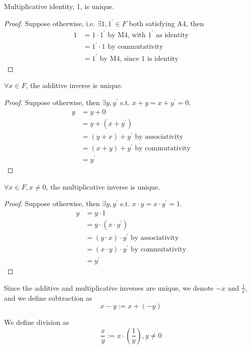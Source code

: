 \begin{remark} Multiplicative identity, 1, is unique.
\end{remark}
\begin{proof} Suppose otherwise, i.e. $\exists 1, 1^{\prime} \in F$ both satisfying A4, then 
  \begin{align*}
      1 &= 1 \cdot 1^{\prime} \text{ by M4, with $1^{\prime}$ as identity} \\
      &= 1^{\prime} \cdot 1 \text{ by commutativity} \\
      &= 1^{\prime} \text{ by M4, since 1 is identity}
  \end{align*}
\end{proof}

\begin{remark} $\forall x \in F$, the additive inverse is unique.
\end{remark}
\begin{proof}Suppose otherwise, then $\exists y, y^{\prime}$ s.t. $x + y = x + y^{\prime} = 0$. \\
  \begin{align*}
      y &= y + 0 \\
      &= y + (x + y^{\prime}) \\
      &= (y + x) + y^{\prime} \text{ by associativity} \\
      &= (x + y) + y^{\prime} \text{ by commutativity} \\
      &= y^{\prime}
  \end{align*}
\end{proof}

\begin{remark} $\forall x \in F, x \neq 0$, the multiplicative inverse is unique.
\end{remark}
\begin{proof}Suppose otherwise, then $\exists y, y^{\prime}$ s.t. $x \cdot y = x \cdot y^{\prime} = 1$. \\
  \begin{align*}
      y &= y \cdot 1 \\
      &= y \cdot (x \cdot y^{\prime}) \\
      &= (y \cdot x) \cdot y^{\prime} \text{ by associativity} \\
      &= (x \cdot y) \cdot y^{\prime} \text{ by commutativity} \\
      &= y^{\prime}
  \end{align*}
\end{proof}

\begin{remark} Since the additive and multiplicative inverses are unique, we denote $-x$ and $\frac{1}{x}$, and we define subtraction as 
  \[
      x - y := x + (-y)
  \]

  We define division as 
  \[
      \frac{x}{y} := x \cdot \left( \frac{1}{y} \right) , y \neq 0
  \]
\end{remark}

